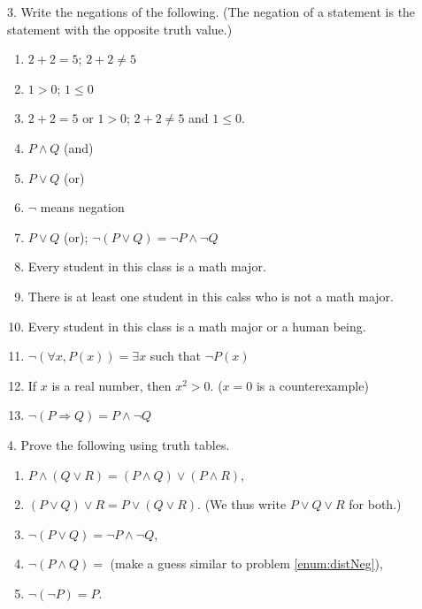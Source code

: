 \documentclass[12pt, reqno]{amsart}
\begin{document}
3. Write the negations of the following. (The negation of a statement is the statement with the opposite truth value.)
\vspace{10pt}
\begin{enumerate}
\item $2 + 2 = 5$; $2 + 2 \not = 5$
\item $1  > 0$; $1  \leq 0$
\item $2 + 2 = 5$ or  $1  > 0$; $2 + 2 \not = 5$ and  $1  \leq 0$.
\item $P \wedge Q$ (and)
\item $P \vee Q$ (or)
\item $\neg$ means negation
\item $P \vee Q$ (or); $\neg (P \vee Q) = \neg P \wedge \neg Q$
\item Every student in this class is a math major.
\item There is at least one student in this calss who is not a math major.
\item Every student in this class is a math major or a human being.
\item $\neg(\forall x, P(x)) = \exists x$ such that $\neg P(x)$
\item If $x$ is a real number, then $x^2 > 0$. ($x = 0$ is a counterexample)
\item $\neg (P \Rightarrow Q) = P \wedge \neg Q$
\end{enumerate}
\vspace{20pt}

4. Prove the following using truth tables.
\vspace{10pt}
\begin{enumerate}
\item $P \wedge(  Q\vee R) = (P\wedge Q) \vee (P \wedge R)$,
\item $(P \vee Q) \vee R = P \vee (Q \vee R)$. (We thus write $P \vee Q \vee R$ for both.)
\item \label{enum:distNeg} $\neg (P \vee Q) = \neg P \wedge \neg Q$,
\item $\neg (P \wedge Q) =$ (make a guess similar to problem \ref{enum:distNeg}),
\item $\neg (\neg P) = P$.
\end{enumerate}
\vspace{20pt}
\end{document}
